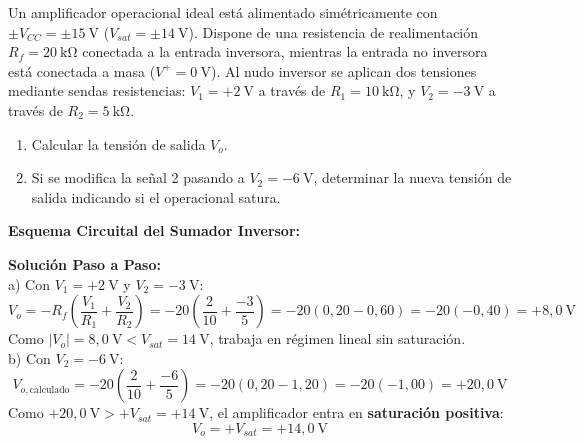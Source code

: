 \begin{ejercicio}
Un amplificador operacional ideal está alimentado simétricamente con $\pm V_{CC} = \pm 15\ \si{\volt}$ ($V_{sat} = \pm 14\ \si{\volt}$). Dispone de una resistencia de realimentación $R_f = 20\ \si{\kilo\ohm}$ conectada a la entrada inversora, mientras la entrada no inversora está conectada a masa ($V^+ = 0\ \si{\volt}$). Al nudo inversor se aplican dos tensiones mediante sendas resistencias: $V_1 = +2\ \si{\volt}$ a través de $R_1 = 10\ \si{\kilo\ohm}$, y $V_2 = -3\ \si{\volt}$ a través de $R_2 = 5\ \si{\kilo\ohm}$.
\begin{enumerate}[label=\alph*)]
    \item Calcular la tensión de salida $V_o$.
    \item Si se modifica la señal 2 pasando a $V_2 = -6\ \si{\volt}$, determinar la nueva tensión de salida indicando si el operacional satura.
\end{enumerate}
\tcbline
\textbf{Esquema Circuital del Sumador Inversor:}\\[4pt]
\begin{center}
\end{center}

\textbf{Solución Paso a Paso:}\\[4pt]
a) Con $V_1 = +2\ \si{\volt}$ y $V_2 = -3\ \si{\volt}$:
\begin{equation}
    V_o = -R_f \left( \frac{V_1}{R_1} + \frac{V_2}{R_2} \right) = -20 \left( \frac{2}{10} + \frac{-3}{5} \right) = -20 (0{,}20 - 0{,}60) = -20 (-0{,}40) = +8{,}0\ \si{\volt}
\end{equation}
Como $|V_o| = 8{,}0\ \si{\volt} < V_{sat} = 14\ \si{\volt}$, trabaja en régimen lineal sin saturación.\\[4pt]
b) Con $V_2 = -6\ \si{\volt}$:
\begin{equation}
    V_{o,\text{calculado}} = -20 \left( \frac{2}{10} + \frac{-6}{5} \right) = -20 (0{,}20 - 1{,}20) = -20 (-1{,}00) = +20{,}0\ \si{\volt}
\end{equation}
Como $+20{,}0\ \si{\volt} > +V_{sat} = +14\ \si{\volt}$, el amplificador entra en \textbf{saturación positiva}:
\begin{equation}
    \boxed{V_o = +V_{sat} = +14{,}0\ \si{\volt}}
\end{equation}
\end{ejercicio}

